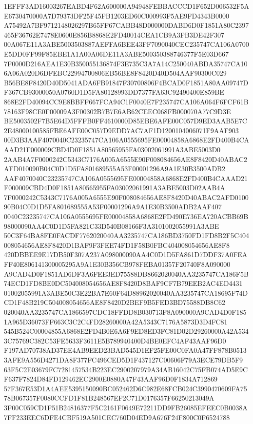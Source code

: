 \documentclass[UTF8,fontset=fandol,zihao=-4,a4paper]{ctexart}
\begin{document}
{{1EFFF3AD16003267EABD4F62A600000A94948FEBBACCCD1F652D006532F5AE6730470000A7D79373DF25F45FB1203ED60C000993F5AE9FD4343B0000
A75492A7BF9712148026297B65FF67CABB48D000000DABD6D0F1851A80C2397465F36762E7478E0600E856B8868E2FD40014CEA1CB9A3FB3DE42F307
00A067E11A3ABE5003503887AEFFA6BEE43FF7090040CEC235747CA106A0700E5DD0FF99F85EBE1A1A00A06DE11A3ABE500350388746377F5E03D667
7F0000D216AEA1E30B350055136874F3E735C3A7A14C250040ABDA35747CA106A06A020D6DFEBC22994700806EB56BE8F8420D40D504AAF90300C029
B56BE8F8420D40D5041ADA6FB91847F30700806F4BCAD0F1851A80AA09747DF367CB93000050A0760D1D5FA80128993DD7377FA63C92490400E859BE
868E2FD40094CC9E8BBFF667FCA94C1F0040E7F235747CA106A064F6FCF61B78163F98CE0F00009A3F00302B7B7E6AB62CEEC068FB000070A77C9D3E
BE5003502F7B5E64D5FFFB0FF4610000D85EBE6AFE00C057D9ED3AAB5E7C2E48000100585FBE6AFE00C057D9EDD7AC7AF1D1200104006071F9AAF903
00D3B3AAF4070040C23235747CA106A0555695FE00004858A6868E2FD400B4CAAAD21F000009CBD4D0F1851A80565955FA03002061991A3ABE5003D0
2AAB4A7F0000242C5343C7176A005A6555E90F008084656AE8F8420D40ABAC2AFD010090B04C0D1D5FA801689555A53F00001296A9A1E30B3500ADB2
AAF4070040C23235747CA106A0555695FE00004858A6868E2FD400B4CAAAD21F000009CBD4D0F1851A80565955FA03002061991A3ABE5003D02AAB4A
7F0000242C5343C7176A005A6555E90F008084656AE8F8420D40ABAC2AFD010090B04C0D1D5FA801689555A53F00001296A9A1E30B3500ADB2AAF407
0040C23235747CA106A0555695FE00004858A6868E2FD490E736EA720ACBB69B98000090AA4C0D1D5FA821C33D540B08166F3A3101002055991A3ABE
50C3F64BA8FE0FACDF7762020040AA3235747CA186BD3750FD1FD8B2F5C404008054656AE8F8420D1BAF9F3FEE74FD1F58B0FBC404008054656AE8F8
420DBBEE9E17DB50F307A237A098000090AA4C0D1D5FA861D7DDF37A0FEAFF40E806141300005295A9A1E30B356CB978FEBA01357F20740F8A090000
A9CAD4D0F1851AD6DF3A6FEE3ED75588DB8662020040AA3235747CA186F5B74ECD1FD8BE0DC504008054656AE8F8420D8BAF9CF7B79EEB2AC4ED4431
01002055991A3ABE50C3E22BA7E60F64D88962020040AA3235747CA18695F74DCD1F48B219C504008054656AE8F8420D2BEF9B5FED3BD75588DB8C62
020040AA3235747CA1866597CDC18FFDD8B030713F8A090000A9CAD4D0F1851A965D36073FF663C3C2C4FD28260000A42A5343C7176A5873D3D4FC81
545B524C00004855A6868E2FD4B0E6A6F9ED8ED3FC81D02D29260000A42A5343C75769C382C53FE5633F3611E5B789940400D4BE0EFC4AF43AAF96D0
F197AD70738AD37EE4AB9EED23BAD545D1EF25FE00C0FA0A47FF878B05133AFE9A556D4271DA8F377FC496CED5D1F437127C00606F79A3ECE79DB5F9
63F5C2E03679FC7281457534B223EC2900207979A34AB16042C75FB074AD5E9CF637F7824D84FD129462EC2900E0880A47F43AAF96D0F1834A712869
57F367E53D1A4AEE5395150090BC052462D6C982E68FCB024C3990470609FA7578B067357F0080CCFD1F81B248567EF2C71D0176357F66250213049A
3F00C059CD1F51B24816377F5C2161F0649E72211DD9FB26085EFEEC0B0038A7FF233EEC6DFE4CBF519A501CEC760D04ED9A676F24F800C0F6524788
}}
\end{document}
